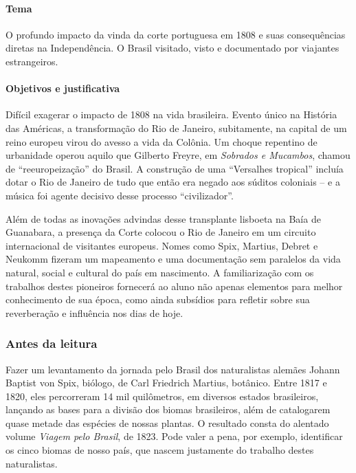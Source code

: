 \documentclass[11pt]{extarticle}
\begin{document}
\paragraph{Tema} O profundo impacto da vinda da corte portuguesa em 1808 e suas
consequências diretas na Independência. O Brasil visitado, visto e documentado
por viajantes estrangeiros. 

 

\paragraph{Objetivos e justificativa}

Difícil exagerar o impacto de 1808 na vida brasileira. Evento único na História
das Américas, a transformação do Rio de Janeiro, subitamente, na capital de um
reino europeu virou do avesso a vida da Colônia. Um choque repentino de
urbanidade operou aquilo que Gilberto Freyre, em \emph{Sobrados e Mucambos}, chamou de
“reeuropeização” do Brasil. A construção de uma “Versalhes tropical” incluía
dotar o Rio de Janeiro de tudo que então era negado aos súditos coloniais –  e
a música foi agente decisivo desse processo “civilizador”.

Além de todas as inovações advindas desse transplante lisboeta na Baía de
Guanabara, a presença da Corte colocou o Rio de Janeiro em um circuito
internacional de visitantes europeus. Nomes como Spix, Martius, Debret e
Neukomm fizeram um mapeamento e uma documentação sem paralelos da vida natural,
social e cultural do país em nascimento. A familiarização com os trabalhos
destes pioneiros fornecerá ao aluno não apenas elementos para melhor
conhecimento de sua época, como ainda subsídios para refletir sobre sua
reverberação e influência nos dias de hoje.

\subsubsection{Antes da leitura}

Fazer um levantamento da jornada pelo Brasil dos naturalistas alemães Johann
Baptist von Spix, biólogo, de Carl Friedrich Martius, botânico. Entre 1817 e
1820, eles percorreram 14 mil quilômetros, em diversos estados brasileiros,
lançando as bases para a divisão dos biomas brasileiros, além de catalogarem
quase metade das espécies de nossas plantas. O resultado consta do alentado
volume \emph{Viagem pelo Brasil}, de 1823. Pode valer a pena, por exemplo, identificar
os cinco biomas de nosso país, que nascem justamente do trabalho destes
naturalistas.
\end{document}
